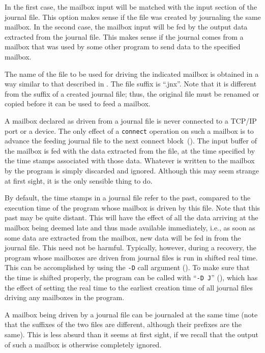In the first case, the mailbox input will be matched with the input section
of the journal file.
This option makes sense if the file was created by
journaling the same mailbox.
In the second case, the mailbox input will be fed by the output data
extracted from the journal file.
This makes sense if the journal comes from a mailbox that was used by
some other program to send data to the specified mailbox.

The name of the file to be used for driving the indicated mailbox is
obtained in a way similar to that described in
.
The file suffix is ``{.jnx}''.
Note that it is different from the suffix of a created journal file; thus,
the original file must be renamed or copied before it can be used to
feed a mailbox.

A mailbox declared as driven from a journal file is never connected to
a TCP/IP port or a device.
The only effect of a {\tt connect} operation on such a mailbox is to
advance the feeding journal file to the next connect block~().
The input buffer of the mailbox is fed with the data extracted from the
file, at the time specified by the time stamps associated with those data.
Whatever is written to the mailbox by the program is simply discarded
and ignored.
Although this may seem strange at first sight, it is the only
sensible thing to do.

By default,
the time stamps in a journal file refer to the
past, compared to the execution time of the program whose
mailbox is driven by this file.
Note that this past may be quite distant.
This will have the effect of all the data arriving at the mailbox being
deemed late and thus made available immediately,
i.e., as soon as some data are extracted from the
mailbox, new data will be fed in from the journal file.
This need not be harmful.
Typically, however, during a recovery, the program whose mailboxes are driven
from journal files is run in shifted real time.
This can be accomplished by using the {\tt -D} call argument
().
To make sure that the time is shifted properly,
the program can be called with ``{\tt -D~J}'' (), which has
the effect of setting the real time to the earliest creation time of all
journal files driving any mailboxes in the program.

A mailbox being driven by a journal file can be journaled at the
same time (note that the
suffixes of the two files are different, although their prefixes are the
same).
This is less absurd than it seems at first sight, if we recall that the
output of such a mailbox is otherwise completely ignored.

